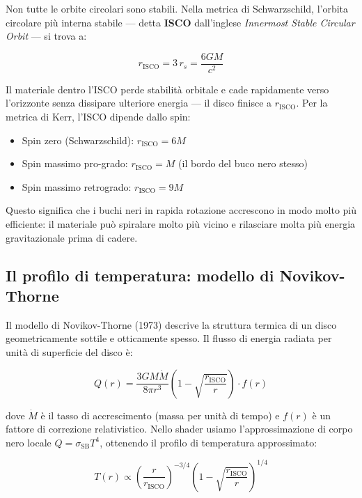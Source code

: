 \documentclass[12pt, a4paper, twoside]{article}
\newenvironment{physbox}[1]{%
  \begin{tcolorbox}[equationbox, title={#1}]
}{%
  \end{tcolorbox}
}
\theoremstyle{definition}
\newcommand{\RS}{r_{\!s}}          %
\newcommand{\Risco}{r_{\!\text{ISCO}}} %
\begin{document}
Non tutte le orbite circolari sono stabili. Nella metrica di Schwarzschild,
l'orbita circolare più interna stabile — detta \textbf{ISCO} dall'inglese
\textit{Innermost Stable Circular Orbit} — si trova a:

\begin{equation}
  \Risco = 3\,\RS = \frac{6GM}{c^2}
  \label{eq:isco}
\end{equation}

Il materiale dentro l'ISCO perde stabilità orbitale e cade rapidamente verso
l'orizzonte senza dissipare ulteriore energia — il disco finisce a $\Risco$.
Per la metrica di Kerr, l'ISCO dipende dallo spin:
\begin{itemize}
  \item Spin zero (Schwarzschild): $\Risco = 6M$
  \item Spin massimo pro-grado: $\Risco = M$ (il bordo del buco nero stesso)
  \item Spin massimo retrogrado: $\Risco = 9M$
\end{itemize}
Questo significa che i buchi neri in rapida rotazione accrescono in modo
molto più efficiente: il materiale può spiralare molto più vicino e rilasciare
molta più energia gravitazionale prima di cadere.

\subsection{Il profilo di temperatura: modello di Novikov-Thorne}

Il modello di Novikov-Thorne (1973) descrive la struttura termica di un disco
geometricamente sottile e otticamente spesso. Il flusso di energia radiata
per unità di superficie del disco è:

\begin{equation}
  Q(r) = \frac{3GM\dot{M}}{8\pi r^3}
         \left(1 - \sqrt{\frac{\Risco}{r}}\right)
         \cdot f(r)
\end{equation}

dove $\dot{M}$ è il tasso di accrescimento (massa per unità di tempo) e $f(r)$
è un fattore di correzione relativistico. Nello shader usiamo l'approssimazione
di corpo nero locale $Q = \sigma_{\text{SB}} T^4$, ottenendo il profilo di
temperatura approssimato:

\begin{physbox}{Profilo di temperatura del disco}
\begin{equation}
  T(r) \propto \left(\frac{r}{\Risco}\right)^{-3/4}
               \left(1 - \sqrt{\frac{\Risco}{r}}\right)^{1/4}
  \label{eq:temperature_profile}
\end{equation}
\end{physbox}
\end{document}
